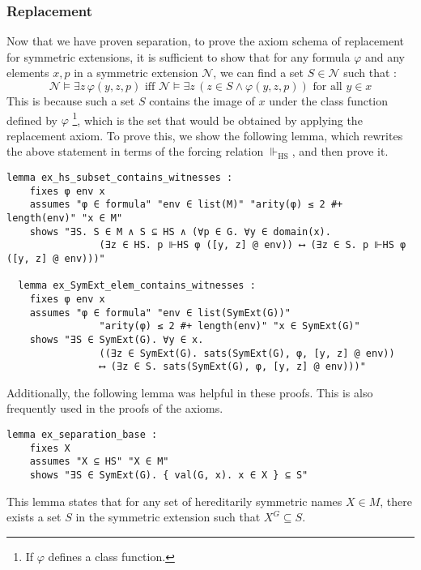\documentclass{report}
\newenvironment{isaframe}{\begin{mdframed}[topline=false, rightline=false, bottomline=false]}{\end{mdframed}}
\begin{document}
\subsubsection{Replacement}
Now that we have proven separation, to prove the axiom schema of replacement for symmetric extensions,
it is sufficient to show that for any formula $\varphi$ and any elements $x, p$ in a symmetric extension $\mathcal{N}$,
we can find a set $S \in \mathcal{N}$ such that : 
$$\mathcal{N} \vDash \exists z \, \varphi(y, z, p) \text{ iff }
  \mathcal{N} \vDash \exists z \, (z \in S \land \varphi(y, z, p)) \text{ for all } y \in x$$
This is because such a set $S$ contains the image of $x$ under the class function defined by $\varphi$ 
\footnote{If $\varphi$ defines a class function.},
which is the set that would be obtained by applying the replacement axiom.
To prove this, we show the following lemma, which rewrites the above statement in terms of the forcing relation $\Vdash_{\mathrm{HS}}$,
and then prove it.
\begin{isaframe}
\begin{verbatim}
lemma ex_hs_subset_contains_witnesses : 
    fixes φ env x 
    assumes "φ ∈ formula" "env ∈ list(M)" "arity(φ) ≤ 2 #+ length(env)" "x ∈ M" 
    shows "∃S. S ∈ M ∧ S ⊆ HS ∧ (∀p ∈ G. ∀y ∈ domain(x). 
                (∃z ∈ HS. p ⊩HS φ ([y, z] @ env)) ⟷ (∃z ∈ S. p ⊩HS φ ([y, z] @ env)))" 

  lemma ex_SymExt_elem_contains_witnesses : 
    fixes φ env x 
    assumes "φ ∈ formula" "env ∈ list(SymExt(G))" 
                "arity(φ) ≤ 2 #+ length(env)" "x ∈ SymExt(G)" 
    shows "∃S ∈ SymExt(G). ∀y ∈ x. 
                ((∃z ∈ SymExt(G). sats(SymExt(G), φ, [y, z] @ env)) 
                ⟷ (∃z ∈ S. sats(SymExt(G), φ, [y, z] @ env)))"
\end{verbatim}
\end{isaframe}

Additionally, the following lemma was helpful in these proofs.
This is also frequently used in the proofs of the axioms.

\begin{isaframe}
\begin{verbatim}
lemma ex_separation_base : 
    fixes X 
    assumes "X ⊆ HS" "X ∈ M" 
    shows "∃S ∈ SymExt(G). { val(G, x). x ∈ X } ⊆ S" 
\end{verbatim}
\end{isaframe}
This lemma states that for any set of hereditarily symmetric names $X \in M$, 
there exists a set $S$ in the symmetric extension such that $X^G \subseteq S$.
\end{document}
